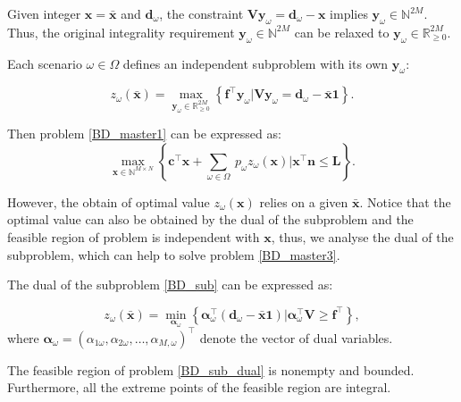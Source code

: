Given integer $\mathbf{x} = \mathbf{\bar{x}}$ and $\mathbf{d}_{\omega}$, the constraint $\mathbf{V} \mathbf{y}_{\omega} = \mathbf{d}_{\omega} -\mathbf{x}$ implies $\mathbf{y}_{\omega} \in \mathbb{N}^{2M}$. Thus, the original integrality requirement $\mathbf{y}_{\omega} \in \mathbb{N}^{2M}$ can be relaxed to $\mathbf{y}_{\omega} \in \mathbb{R}^{2M}_{\scriptscriptstyle \geq 0}$.

Each scenario $\omega \in \Omega$ defines an independent subproblem with its own $\mathbf{y}_{\omega}$:

\begin{equation}\label{BD_sub}
  z_{\omega}(\mathbf{\bar{x}}) = \max_{\mathbf{y}_{\omega} \in \mathbb{R}^{2M}_{\scriptscriptstyle \geq 0}} \left\{
  \mathbf{f}^{\intercal} \mathbf{y}_{\omega}\Big| \mathbf{V} \mathbf{y}_{\omega} = \mathbf{d}_{\omega} - \mathbf{\bar{x}} \mathbf{1}
  \right\}.
\end{equation}

Then problem \eqref{BD_master1} can be expressed as:
\begin{equation}\label{BD_master3}
  \max_{\mathbf{x} \in \mathbb{N}^{M \times N}} \left\{ \mathbf{c}^{\intercal} \mathbf{x} + \sum_{\omega \in \Omega} ~ p_{\omega} z_{\omega}(\mathbf{x}) \bigg| \mathbf{x}^{\intercal} \mathbf{n} \leq \mathbf{L} \right\}.
\end{equation}


However, the obtain of optimal value $z_{\omega}(\mathbf{x})$ relies on a given $\mathbf{\bar{x}}$. Notice that the optimal value can also be obtained by the dual of the subproblem and the feasible region of problem is independent with $\mathbf{x}$, thus, we analyse the dual of the subproblem, which can help to solve problem \eqref{BD_master3}.


The dual of the subproblem \eqref{BD_sub} can be expressed as:

\begin{equation}\label{BD_sub_dual}
  z_{\omega}(\mathbf{\bar{x}}) = \min_{\bm{\alpha}_{\omega}} \left\{
    \bm{\alpha}_{\omega}^{\intercal} (\mathbf{d}_{\omega}- \mathbf{\bar{x}} \mathbf{1})\Big| \bm{\alpha}_{\omega}^{\intercal} \mathbf{V} \geq \mathbf{f}^{\intercal}
  \right\},
\end{equation}
where $\bm{\alpha}_{\omega} = (\alpha_{1\omega},\alpha_{2\omega}, \ldots, \alpha_{M,\omega})^{\intercal}$ denote the vector of dual variables. 

\begin{lem}\label{feasible_region}
  The feasible region of problem \eqref{BD_sub_dual} is nonempty and bounded. Furthermore, all the extreme points of the feasible region are integral.
 \end{lem}
 
